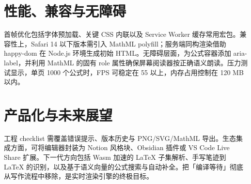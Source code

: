 \chapter{性能、兼容与无障碍}
首帧优化包括字体预加载、关键 CSS 内联以及 Service Worker 缓存常用宏包。兼容性上，Safari 14 以下版本需引入 MathML polyfill；服务端同构渲染借助 happy-dom 在 Node.js 环境生成初始 HTML。无障碍层面，为公式容器添加 aria-label，并利用 MathML 的固有 role 属性确保屏幕阅读器按正确语义朗读。压力测试显示，单页 1000 个公式时，FPS 可稳定在 55 以上，内存占用控制在 120 MB 以内。\par
\chapter{产品化与未来展望}
工程 checklist 需覆盖错误提示、版本历史与 PNG/SVG/MathML 导出。生态集成方面，可将编辑器封装为 Notion 风格块、Obsidian 插件或 VS Code Live Share 扩展。下一代方向包括 Wasm 加速的 LaTeX 子集解析、手写笔迹到 LaTeX 的识别，以及基于语义向量的公式搜索与自动补全。把「编译等待」彻底从写作流程中移除，是实时渲染引擎的终极目标。\par
